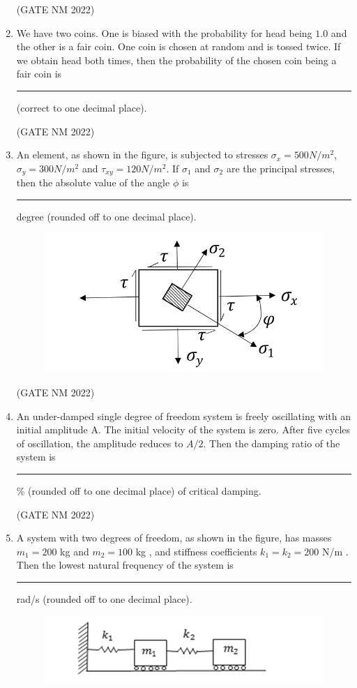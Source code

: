 \documentclass[journal,12pt,onecolumn]{IEEEtran}
\theoremstyle{remark}
\begin{document}
\begin{enumerate}
\hfill(GATE NM 2022)

\item We have two coins. One is biased with the probability for head being $1.0$ and the other is a fair coin. One coin is chosen at random and is tossed twice. If we obtain head both times, then the probability of the chosen coin being a fair coin is \rule{3cm}{0.15mm}  (correct to one decimal place).

\hfill(GATE NM 2022)

\item An element, as shown in the figure, is subjected to stresses $\sigma_x = 500  N/m^2 $, $\sigma_y = 300  N/m^2 $ and $\tau_{xy} = 120  N/m^2 $.  
If $\sigma_1$ and $\sigma_2$ are the principal stresses, then the absolute value of the angle $\phi$ is \rule{3cm}{0.15mm} degree (rounded off to one decimal place).
\begin{figure}[h]
\centering
\includegraphics[width=0.3\columnwidth]{fig12}
\caption{}
\label{fig:placeholder}
\end{figure}

\hfill(GATE NM 2022)

\item An under-damped single degree of freedom system is freely oscillating with an initial amplitude A. The initial velocity of the system is zero. After five cycles of oscillation, the amplitude reduces to $A/2$.  
Then the damping ratio of the system is \rule{3cm}{0.15mm} \% (rounded off to one decimal place) of critical damping.

\hfill(GATE NM 2022)

\item A system with two degrees of freedom, as shown in the figure, has masses  
$m_1 = 200$ kg and $m_2 = 100$ kg , and stiffness coefficients  
$k_1 = k_2 = 200$ N/m .  
Then the lowest natural frequency of the system is  
\rule{3cm}{0.15mm}  rad/s  (rounded off to one decimal place).
 \begin{figure}[h]
	 \centering
	 \includegraphics[width=0.3\columnwidth]{fig13}
	 \caption{}
	 \label{fig:placeholder}
 \end{figure}


\end{enumerate}
\end{document}
